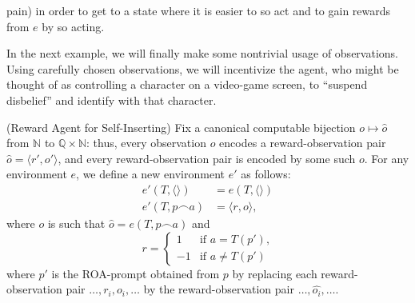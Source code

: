 \documentclass[runningheads]{llncs}
\begin{document}
\begin{example}
\begin{itemize}
        pain) in order to get to a state where it is easier to so act and
        to gain rewards from $e$ by so acting.
    \end{itemize}
\end{example}

In the next example,
we will finally make some nontrivial usage of observations. Using carefully chosen
observations, we will incentivize the agent, who might be thought of as
controlling a character on a video-game screen,
to ``suspend disbelief'' and identify with that character.

\begin{example}
\label{selfinsertionexample}
    (Reward Agent for Self-Inserting)
    Fix a canonical computable bijection
    $o\mapsto \hat o$
    from $\mathbb N$ to $\mathbb Q\times \mathbb N$:
    thus, every observation $o$ encodes a reward-observation pair
    $\hat o = \langle r',o'\rangle$, and every reward-observation pair
    is encoded by some such $o$.
    For any environment $e$, we define
    a new environment $e'$ as follows:
    \begin{align*}
        e'(T,\langle\rangle) &= e(T,\langle\rangle)\\
        e'(T,p\frown a) &= \langle r,o\rangle,
    \end{align*}
    where $o$ is such that $\hat o = e(T,p\frown a)$ and
    \[
        r =
        \begin{cases}
            1 & \mbox{if $a=T(p')$,}\\
            -1 & \mbox{if $a\not=T(p')$}
        \end{cases}
    \]
    where
    $p'$ is the ROA-prompt obtained from $p$
    by replacing each reward-observation pair
    $\ldots,r_i,o_i,\ldots$ by the reward-observation
    pair $\ldots,\widehat{o_i},\ldots$.
\end{example}
\end{document}
